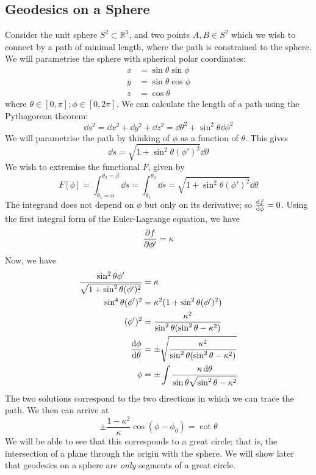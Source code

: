 \subsection{Geodesics on a Sphere}
Consider the unit sphere \( S^2 \subset \mathbb R^3 \), and two points \( A, B \in S^2 \) which we wish to connect by a path of minimal length, where the path is constrained to the sphere. We will parametrise the sphere with spherical polar coordinates:
\begin{align*}
    x &= \sin\theta \sin\phi\\
    y &= \sin\theta\cos\phi \\
    z &= \cos\theta
\end{align*}
where \( \theta \in [0, \pi]; \phi \in [0, 2\pi] \). We can calculate the length of a path using the Pythagorean theorem:
\[ \dd{s}^2 = \dd{x}^2 + \dd{y}^2 + \dd{z}^2 = \dd{\theta}^2 + \sin^2 \theta \dd{\phi}^2 \]
We will parametrise the path by thinking of \( \phi \) as a function of \( \theta \). This gives
\[ \dd{s} = \sqrt{1 + \sin^2 \theta (\phi')^2} \dd{\theta} \]
We wish to extremise the functional \( F \), given by
\[ F[\phi] = \int_{\theta_1 = \alpha}^{\theta_2 = \beta} \dd{s} = \int_{\theta_1}^{\theta_2} \dd{s} = \sqrt{1 + \sin^2 \theta (\phi')^2} \dd{\theta} \]
The integrand does not depend on \( \phi \) but only on its derivative; so \( \dv{f}{\phi} = 0 \). Using the first integral form of the Euler-Lagrange equation, we have
\[ \pdv{f}{\phi'} = \kappa \]
Now, we have
\begin{align*}
    \frac{\sin^2 \theta \phi'}{\sqrt{1 + \sin^2 \theta (\phi')^2}} &= \kappa \\
    \sin^4 \theta (\phi')^2 &= \kappa^2 (1 + \sin^2 \theta (\phi')^2) \\
    (\phi')^2 &= \frac{\kappa^2}{\sin^2 \theta (\sin^2 \theta - \kappa^2)} \\
    \dv{\phi}{\theta} &= \pm\sqrt{\frac{\kappa^2}{\sin^2 \theta (\sin^2 \theta - \kappa^2)}} \\
    \phi &= \pm\int \frac{\kappa \dd{\theta}}{\sin \theta \sqrt{\sin^2 \theta - \kappa^2}} \\
\end{align*}
The two solutions correspond to the two directions in which we can trace the path. We then can arrive at
\[ \pm \frac{1 - \kappa^2}{\kappa} \cos(\phi - \phi_0) = \cot \theta \]
We will be able to see that this corresponds to a great circle; that is, the intersection of a plane through the origin with the sphere. We will show later that geodesics on a sphere are \textit{only} segments of a great circle.

